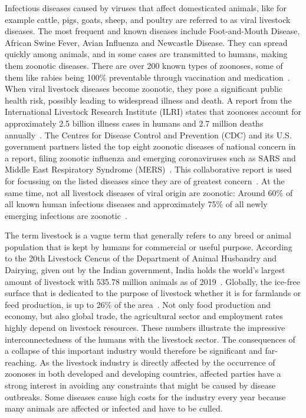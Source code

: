 Infectious diseases caused by viruses that affect domesticated animals, like for example cattle, pigs, goats, sheep, and poultry are referred to as viral livestock diseases. The most frequent and known diseases include Foot-and-Mouth Disease, African Swine Fever, Avian Influenza and Newcastle Disease. They can spread quickly among animals, and in some cases are transmitted to humans, making them zoonotic diseases. There are over 200 known types of zoonoses, some of them like rabies being 100\% preventable through vaccination and medication~\cite{who2020zoon}. When viral livestock diseases become zoonotic, they pose a significant public health risk, possibly leading to widespread illness and death. A report from the International Livestock Research Institute (ILRI) states that zoonoses account for approximately 2.5 billion illness cases in humans and 2.7 million deaths annually~\cite{grace2012mapping}. The Centres for Disease Control and Prevention (CDC) and its U.S. government partners listed the top eight zoonotic diseases of national concern in a report, filing zoonotic influenza and emerging coronaviruses such as SARS and Middle East Respiratory Syndrome (MERS)~\cite{brown2006recent}. This collaborative report is used for focussing on the listed diseases since they are of greatest concern~\cite{centers8zoonotic}. At the same time, not all livestock diseases of viral origin are zoonotic: Around 60\% of all known human infectious diseases and approximately 75\% of all newly emerging infections are zoonotic~\cite{jones2008global}.

The term livestock is a vague term that generally refers to any breed or animal population that is kept by humans for commercial or useful purpose. According to the 20th Livestock Cencus of the Department of Animal Husbandry and Dairying, given out by the Indian government, India holds the world's largest amount of livestock with 535.78 million animals as of 2019~\cite{livestock2019}. Globally, the ice-free surface that is dedicated to the purpose of livestock whether it is for farmlands or feed production, is up to 26\% of the area~\cite{steinfeld2006livestock}. Not only food production and economy, but also global trade, the agricultural sector and employment rates highly depend on livestock resources. These numbers illustrate the impressive interconnectedness of the humans with the livestock sector. The consequences of a collapse of this important industry would therefore be significant and far-reaching. As the livestock industry is directly affected by the occurrence of zoonoses in both developed and developing countries, affected parties have a strong interest in avoiding any constraints that might be caused by disease outbreaks. Some diseases cause high costs for the industry every year because many animals are affected or infected and have to be culled.

